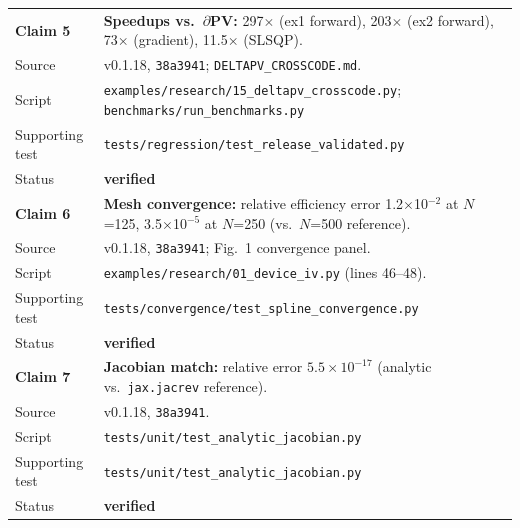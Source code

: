 \documentclass[11pt,a4paper]{article}
\begin{document}
\begin{table}[tbp]
\begin{tabularx}{\linewidth}{@{}Z Y@{}}
\textbf{Claim 5} &
\textbf{Speedups vs.\ $\partial$PV:}
  297$\times$ (ex1 forward), 203$\times$ (ex2 forward),
  73$\times$ (gradient), 11.5$\times$ (SLSQP). \\
Source & v0.1.18, \texttt{38a3941}; \texttt{DELTAPV\_CROSSCODE.md}. \\
Script & \texttt{examples/research/15\_deltapv\_crosscode.py};
  \texttt{benchmarks/run\_benchmarks.py} \\
Supporting test & \texttt{tests/regression/test\_release\_validated.py} \\
Status & \textcolor{green!50!black}{\textbf{verified}} \\[4pt]

\textbf{Claim 6} &
\textbf{Mesh convergence:} relative efficiency error
  1.2$\times$10$^{-2}$ at $N$=125,
  3.5$\times$10$^{-5}$ at $N$=250 (vs.\ $N$=500 reference). \\
Source & v0.1.18, \texttt{38a3941}; Fig.~1 convergence panel. \\
Script & \texttt{examples/research/01\_device\_iv.py} (lines 46--48). \\
Supporting test & \texttt{tests/convergence/test\_spline\_convergence.py} \\
Status & \textcolor{green!50!black}{\textbf{verified}} \\[4pt]

\textbf{Claim 7} &
\textbf{Jacobian match:} relative error $5.5{\times}10^{-17}$
  (analytic vs.\ \texttt{jax.jacrev} reference). \\
Source & v0.1.18, \texttt{38a3941}. \\
Script & \texttt{tests/unit/test\_analytic\_jacobian.py} \\
Supporting test & \texttt{tests/unit/test\_analytic\_jacobian.py} \\
Status & \textcolor{green!50!black}{\textbf{verified}} \\[4pt]


\end{tabularx}
\end{table}
\end{document}
